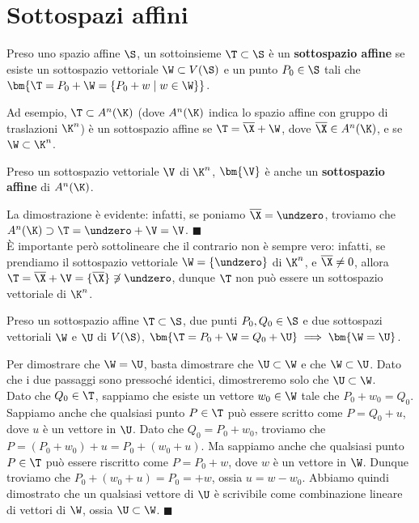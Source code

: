 \documentclass[11pt, a4paper, titlepage, oneside]{scrbook}
\begin{document}
\section{Sottospazi affini}

\begin{Definizione}
\label{def-sottospazio-affine}
Preso uno spazio affine $\S$, un sottoinsieme $\T \subset \S$ è un \textbf{sottospazio affine} se esiste un sottospazio vettoriale $\W \subset V(\S)$ e un punto $P_0 \in \S$ tali che $\bm{\T = P_0 + \W = \{P_0 + w \mid w \in \W\}}$.
\end{Definizione}

Ad esempio, $\T \subset A^n(\K)$ (dove $A^n(\K)$ indica lo spazio affine con gruppo di traslazioni $\K^n$) è un sottospazio affine se $\T = \overline{\X} + \W$, dove $\overline{\X} \in A^n(\K)$, e se $\W \subset \K^n$.

\begin{Proposizione}[]
\label{propos-sottospazio vettoriale e sottospazio affine}
Preso un sottospazio vettoriale $\V$ di $\K^n$, $\bm{\V}$ è anche un \textbf{sottospazio affine} di $A^n(\K)$.
\end{Proposizione}

\Dimostrazione \nopagebreak

La dimostrazione è evidente: infatti, se poniamo $\overline{\X} = \undzero$, troviamo che $A^n(\K) \supset \T = \undzero + \V = \V$. $\blacksquare$ \\
È importante però sottolineare che il contrario non è sempre vero: infatti, se prendiamo il sottospazio vettoriale $\W = \{\undzero\}$ di $\K^n$, e $\overline{\X} \neq 0$, allora $\T = \overline{\X} + \V = \{\overline{\X}\} \not\ni \undzero$, dunque $\T$ non può essere un sottospazio vettoriale di $\K^n$. 

\begin{Proposizione}[]
\label{propos-sottospazio-affine}
Preso un sottospazio affine $\T \subset \S$, due punti $P_0,Q_0 \in \S$ e due sottospazi vettoriali $\W$ e $\U$ di $V(\S)$, $\bm{\T = P_0 + \W = Q_0 + \U} \implies \bm{\W = \U}$.
\end{Proposizione}

\Dimostrazione \nopagebreak

Per dimostrare che $\W = \U$, basta dimostrare che $\U \subset \W$ e che $\W \subset \U$. Dato che i due passaggi sono pressoché identici, dimostreremo solo che $\U \subset \W$. \\
Dato che $Q_0 \in \T$, sappiamo che esiste un vettore $w_0 \in \W$ tale che $P_0 + w_0 = Q_0$. Sappiamo anche che qualsiasi punto $P \in \T$ può essere scritto come $P = Q_0 + u$, dove $u$ è un vettore in $\U$. Dato che $Q_0 = P_0 + w_0$, troviamo che $P = (P_0 + w_0) + u = P_0 + (w_0 + u)$. Ma sappiamo anche che qualsiasi punto $P \in \T$ può essere riscritto come $P = P_0 + w$, dove $w$ è un vettore in $\W$. Dunque troviamo che $P_0 + (w_0 + u) = P_0 = + w$, ossia $u = w - w_0$. Abbiamo quindi dimostrato che un qualsiasi vettore di $\U$ è scrivibile come combinazione lineare di vettori di $\W$, ossia $\U \subset \W$. $\blacksquare$
\end{document}
